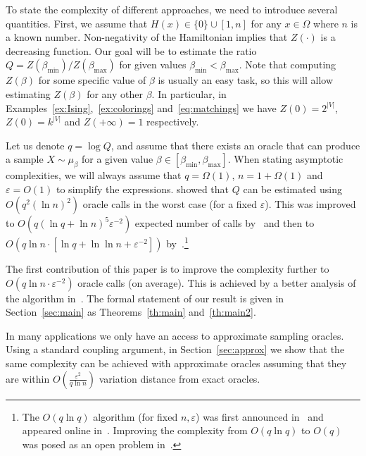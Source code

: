\documentclass[final,12pt]{colt2018}
\def\myparagraph#1{\vspace{2pt}\noindent{\bf #1~~}}
\def\bmin{{\beta_{\min}}}
\def\bmax{{\beta_{\max}}}
\begin{document}
\myparagraph{Formal description}
To state the complexity of different approaches, we need to introduce several quantities.
First, we assume that $H(x)\in\{0\}\cup[1,n]$ for any $x\in\Omega$ where $n$ is a known number.
Non-negativity of the Hamiltonian implies that $Z(\cdot)$ is a decreasing function.
Our goal will be to estimate the ratio  $Q=Z(\bmin)/Z(\bmax)$ for given values $\bmin<\bmax$.
Note that computing $Z(\beta)$ for some specific value of $\beta$ is usually an easy task, so this will allow estimating $Z(\beta)$ for any other $\beta$.
In particular,  in Examples~\ref{ex:Ising},~\ref{ex:colorings} and~\ref{eq:matchings}
we have 
 $Z(0)=2^{|V|}$, $Z(0)=k^{|V|}$ and $Z(+\infty)=1$
respectively.

Let us denote $q=\log Q$, and  assume that there exists an oracle that can produce a sample $X\sim\mu_\beta$ for a given value $\beta\in[\bmin,\bmax]$.
When stating asymptotic complexities, we will always assume that $q=\Omega(1)$, $n=1+\Omega(1)$ and $\varepsilon=O(1)$ to simplify the expressions.
%
\cite{Bezakova08} showed that $Q$ can be estimated
using $O(q^2 (\ln n)^2)$ oracle calls in the worst case (for a fixed $\varepsilon$). 
This was improved to $O(q (\ln q + \ln n)^5\varepsilon^{-2})$ expected number of calls
 by~\cite{Stefankovic:JACM09} 
and then to $O(q\ln n\cdot[\ln q + \ln \ln n+\varepsilon^{-2}])$ by~\cite{Huber:Gibbs}.\footnote{The $O(q\ln q)$ algorithm
(for fixed $n,\varepsilon$)
was first announced in~\cite[Section 7]{TPA:arXiv} and appeared online in~\citep{Huber:Gibbs:arXiv}.
Improving the complexity from $O(q\ln q)$ to 
$O(q)$ was posed as an open problem in~\cite[Section 7]{TPA:arXiv}.}

The first contribution of this paper is to improve the complexity further to $O(q\ln n \cdot  \varepsilon^{-2}    )$
oracle calls (on average). This is achieved by a better analysis of the algorithm in~\citep{Huber:Gibbs}.
The formal statement of our result is given in Section~\ref{sec:main} as Theorems~\ref{th:main} and~\ref{th:main2}.

In many applications we only have an access to approximate sampling oracles.
Using a standard coupling argument, in Section~\ref{sec:approx} we show
that the same complexity can be achieved with approximate oracles assuming that they are within $O(\frac{\varepsilon^2}{q\ln n})$
variation distance from exact oracles.
\end{document}
